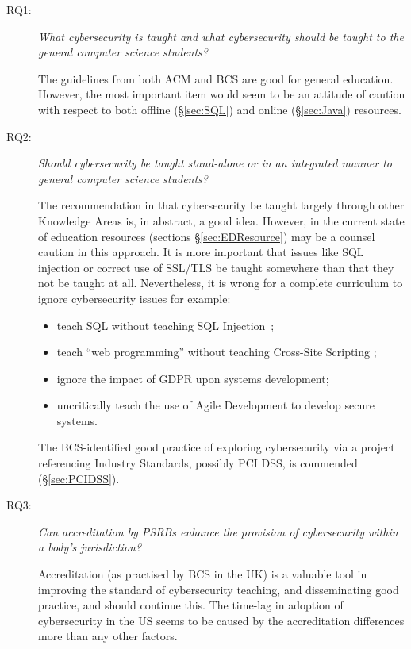 \documentclass[conference]{IEEEtran}
\begin{document}
\begin{description}
\item[RQ1:] {\emph{What cybersecurity is taught and what cybersecurity should be taught to the general computer science students?}}

The guidelines from both ACM and BCS are good for general education. However, the most important item would seem to be an attitude of caution with respect to both offline (\S\ref{sec:SQL}) and online (\S\ref{sec:Java}) resources. 

\item[RQ2:] {\emph{Should cybersecurity be taught stand-alone or in an integrated manner to general computer science students?}}

The recommendation in \cite[p. 98]{ACM2013a} that cybersecurity be taught largely through other Knowledge Areas is, in abstract, a good idea.  However, in the current state of education resources (sections \S\ref{sec:EDResource})  may be a counsel caution in this approach.  It is more important that issues like SQL injection \cite{Drop2019} or correct use of SSL/TLS \cite{Chenetal2019a} be taught somewhere than that they not be taught at all.
Nevertheless, it is wrong for a complete curriculum to ignore cybersecurity issues for example:
\begin{itemize}
	\item teach SQL without teaching SQL Injection~\cite{Drop2019};
	\item teach ``web programming'' without teaching Cross-Site Scripting \cite[(XSS)]{OWASP2017a};
	\item ignore the  impact of GDPR upon systems development;
	\item uncritically teach the use of Agile Development to develop secure systems.
\end{itemize}
\par
The BCS-identified good practice of exploring cybersecurity via a project referencing Industry Standards, possibly PCI DSS, is commended (\S\ref{sec:PCIDSS}).

\item[RQ3:] {\emph{Can accreditation by PSRBs enhance the provision of cybersecurity within a body's jurisdiction?}}

Accreditation (as practised by BCS in the UK) is a valuable tool in improving the standard of cybersecurity teaching, and disseminating good practice, and should continue this. The time-lag in adoption of cybersecurity in the US seems to be caused by the accreditation differences more than any other factors.
\end{description}
\end{document}
